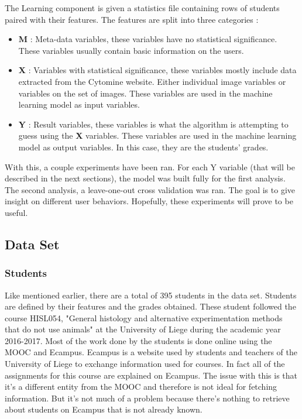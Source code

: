 \documentclass[a4paper,11pt]{report}
\numberwithin{figure}{section} %
\begin{document}
    The Learning component is given a statistics file containing rows of students paired with their features.
    The features are split into three categories :
    \begin{itemize}
\item[\textbullet] \textbf{M} : Meta-data variables, these variables have no statistical significance.
These variables usually contain basic information on the users.\\
\item[\textbullet] \textbf{X} : Variables with statistical significance, these variables mostly include data extracted from the Cytomine website.
Either individual image variables or variables on the set of images.
These variables are used in the machine learning model as input variables.\\
\item[\textbullet] \textbf{Y} : Result variables, these variables is what the algorithm is attempting to guess using the  \textbf{X} variables.
These variables are used in the machine learning model as output variables. In this case, they are the students' grades.\\
\end{itemize}
    
    With this, a couple experiments have been ran.
    For each Y variable (that will be described in the next sections), the model was built fully for the first analysis.
    The second analysis, a leave-one-out cross validation was ran.
    The goal is to give insight on different user behaviors.
    Hopefully, these experiments will prove to be useful.
    
    \subsection{Data Set} \label{Data_Set}
    
    	\subsubsection{Students}
    Like mentioned earlier, there are a total of 395 students in the data set.
    Students are defined by their features and the grades obtained.
    These student followed the course HISL054, "General histology and alternative experimentation methods that do not use animals" at the University of Liege during the academic year 2016-2017.
    Most of the work done by the students is done online using the MOOC and Ecampus.
    Ecampus is a website used by students and teachers of the University of Liege to exchange information used for courses.
    In fact all of the assignments for this course are explained on Ecampus.
    The issue with this is that it's a different entity from the MOOC and therefore is not ideal for fetching information.
    But it's not much of a problem because there's nothing to retrieve about students on Ecampus that is not already known.\newline
    
\end{document}
